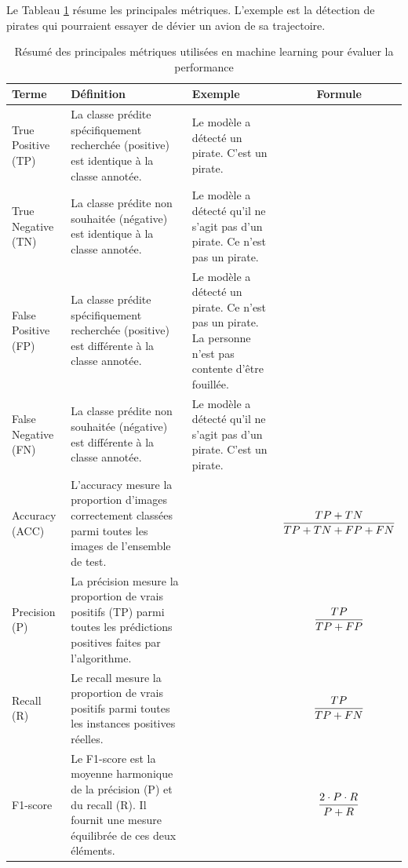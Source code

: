 Le Tableau \ref{tab:metriques_ml} résume les principales métriques. L'exemple est la détection de pirates qui pourraient essayer de dévier un avion de sa trajectoire.
\renewcommand{\arraystretch}{1.8}
\begin{table}[H]
    \centering
    \begin{tabular}{|p{2cm}|p{4cm}|p{4cm}|c|}
    \hline
    \textbf{Terme} & \textbf{Définition} & \textbf{Exemple} & \textbf{Formule} \\
    \hline
    True Positive (TP) & La classe prédite spécifiquement recherchée (positive) est identique à la classe annotée. & Le modèle a détecté un pirate. C'est un pirate. & \\
    \hline
    True Negative (TN) & La classe prédite non souhaitée (négative) est identique à la classe annotée. & Le modèle a détecté qu'il ne s'agit pas d'un pirate. Ce n'est pas un pirate. & \\
    \hline
    False Positive (FP) & La classe prédite spécifiquement recherchée (positive) est différente à la classe annotée. & Le modèle a détecté un pirate. Ce n'est pas un pirate. La personne n'est pas contente d'être fouillée. & \\
    \hline
    False Negative (FN) & La classe prédite non souhaitée (négative) est différente à la classe annotée. & Le modèle a détecté qu'il ne s'agit pas d'un pirate. C'est un pirate. & \\
    \hline
    Accuracy (ACC) & L'accuracy mesure la proportion d'images correctement classées parmi toutes les images de l'ensemble de test. & & $\small\displaystyle\frac{TP + TN}{TP + TN + FP + FN}$ \\
    \hline
    Precision (P) & La précision mesure la proportion de vrais positifs (TP) parmi toutes les prédictions positives faites par l'algorithme. & & $\small\displaystyle\frac{TP}{TP + FP}$ \\
    \hline
    Recall (R) & Le recall mesure la proportion de vrais positifs parmi toutes les instances positives réelles. & & $\small\displaystyle\frac{TP}{TP + FN}$ \\
    \hline
    F1-score & Le F1-score est la moyenne harmonique de la précision (P) et du recall (R). Il fournit une mesure équilibrée de ces deux éléments. & & $\small\displaystyle\frac{2 \cdot P \cdot R}{P + R}$ \\
    \hline
    \end{tabular}
    \caption{Résumé des principales métriques utilisées en machine learning pour évaluer la performance}
    \label{tab:metriques_ml}
\end{table}

